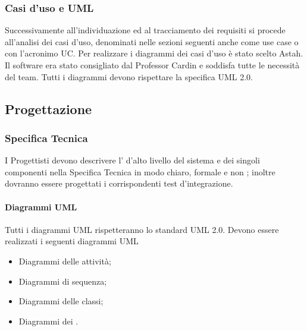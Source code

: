 \subsubsection{Casi d’uso e UML}
\label{7.2}
Successivamente all'individuazione ed al tracciamento dei requisiti si procede all'analisi dei casi d'uso, denominati nelle sezioni seguenti anche come use case o con l'acronimo UC.
Per realizzare i diagrammi  dei casi d'uso è stato scelto Astah. Il software era stato consigliato dal Professor Cardin e soddisfa tutte le necessità del team.
Tutti i diagrammi devono rispettare la specifica UML 2.0.

\subsection{Progettazione}
\label{}
\subsubsection{Specifica Tecnica}
\label{}
I Progettisti devono descrivere l' d'alto livello del sistema e dei singoli componenti nella Specifica Tecnica in modo chiaro, formale e non ; inoltre dovranno essere progettati i corrispondenti test d'integrazione.

\paragraph{Diagrammi UML}
\label{}
Tutti i diagrammi UML rispetteranno lo standard UML 2.0.
Devono essere realizzati i seguenti diagrammi UML
\begin{itemize}
\item Diagrammi delle attività;
\item Diagrammi di sequenza;
\item Diagrammi delle classi;
\item Diagrammi dei .
\end{itemize}

